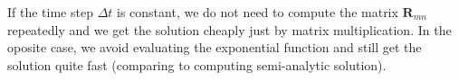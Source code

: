 If the time step $\Delta t$ is constant, we do not need to compute the matrix $\mathbf{R}_{mn}$ repeatedly and we get
the solution cheaply just by matrix multiplication. In the oposite case, we avoid evaluating the exponential
function and still get the solution quite fast (comparing to computing semi-analytic solution).
